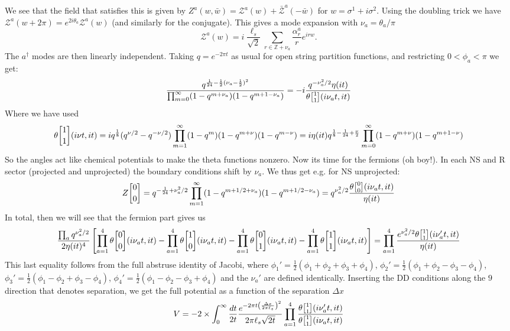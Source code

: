 \documentclass[11pt, class=article, crop=false]{standalone}
\begin{document}
\begin{enumerate}
	We see that the field that satisfies this is given by $Z^a(w, \bar w) = \mathcal Z^a(w) + \bar {\mathcal Z}^a (-\bar w)$ for $w = \sigma^1 + i \sigma^2$. Using the doubling trick we have $\mathcal Z^a(w + 2 \pi) = e^{2 i \theta_a} \mathcal Z^a(w)$ (and similarly for the conjugate). This gives a mode expansion with $\nu_a = \theta_a / \pi$
	\[
		\mathcal Z^a(w) = i \frac{\ell_s}{\sqrt 2} \sum_{r \in \mathbb Z + \nu_a} \frac{\alpha^a_r}{r} e^{i r w}.
	\]
	The $a^\dagger$ modes are then linearly independent. Taking $q = e^{-2\pi t}$ as usual for open string partition functions, and restricting $0 < \phi_a < \pi$ we get:
	\begin{equation*}
		\frac{q^{\frac1{24} - \frac12 (\nu_a - \frac12)^2}}{\prod_{m=0}^\infty (1 - q^{m + \nu_a}) (1 - q^{m + 1 - \nu_a})} = -i \frac{q^{- \nu_a^2/2}\eta(it)}{\theta\twist11 (i \nu_a t, i t)}
	\end{equation*}
	Where we have used 
	\[
		\theta\twist11 (i \nu t , it) = i q^{\frac{1}{8}} (q^{\nu/2} - q^{-\nu/2}) \prod_{m=1}^\infty (1-q^m) (1- q^{m+\nu}) (1- q^{m-\nu}) =i  \eta(i t) q^{\frac18 - \frac{1}{24} + \frac{\nu}{2}} \prod_{m=0}^\infty (1- q^{m+\nu}) (1- q^{m+1-\nu})
	\]
	So the angles act like chemical potentials to make the theta functions nonzero. Now its time for the fermions (oh boy!). In each NS and R sector (projected and unprojected) the boundary conditions shift by $\nu_a$. We thus get e.g. for NS unprojected:
	\[
		Z\twist00 = q^{-\frac1{24} + \nu_a^2/2} \prod_{m=1}^\infty (1-q^{m+1/2 + \nu_a}) (1-q^{m + 1/2 - \nu_a}) = q^{\nu_a^2/2} \frac{\theta\twist00 (i \nu_a t , it)}{\eta(i t)}
	\]
	In total, then we will see that the fermion part gives us
	\[
		\frac{\prod_a q^{\nu_a^2/2}}{2 \eta(it)^4} \left[\prod_{a=1}^4 \theta\twist00 (i \nu_a t, it) - \prod_{a=1}^4 \theta\twist10 (i \nu_a t, it) - \prod_{a=1}^4 \theta\twist01 (i \nu_a t, it) - \prod_{a=1}^4 \theta\twist11 (i \nu_a t, it) \right]= \prod_{a=1}^4 \frac{e^{\nu_a^2/2}\theta\twist11 (i \nu_a' t, it)}{\eta(it)}
	\]
	This last equality follows from the full abstruse identity of Jacobi, where $\phi_1' = \frac12 (\phi_1 + \phi_2 + \phi_3 + \phi_4)$, $\phi_2' = \frac12 (\phi_1 + \phi_2 - \phi_3 - \phi_4)$, $\phi_3' = \frac12 (\phi_1 - \phi_2 + \phi_3 - \phi_4)$, $\phi_4' = \frac12 (\phi_1 - \phi_2 - \phi_3 + \phi_4)$ and the $\nu_a'$ are defined identically.
	Inserting the DD conditions along the $9$ direction that denotes separation, we get the full potential  as a function of the separation $\Delta x$
	\begin{equation}\label{eq:partitionfunc}
		V = - 2 \times \int_0^\infty \frac{dt}{2t} \frac{e^{-2 \pi t \left( \frac{\Delta x}{2\pi \ell_s} \right)^2}}{2\pi \ell_s \sqrt{2t}} \prod_{a=1}^4 \frac{\theta \twist11 (i \nu'_a t, i t)}{\theta \twist11 (i \nu_a t, i t)}

\end{equation}
\end{enumerate}
\end{document}
